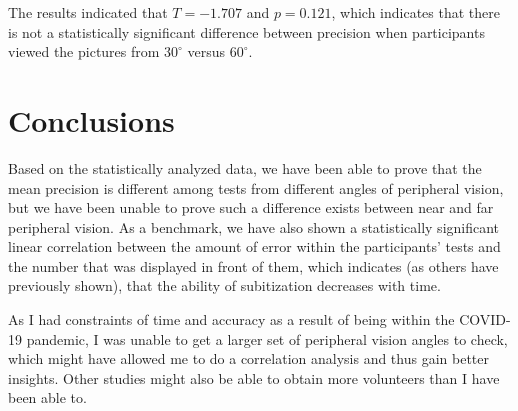 \documentclass[12pt]{article}
\begin{document}
The results indicated that $T = -1.707$ and $p = 0.121$, which indicates that
there is not a statistically significant difference between precision when
participants viewed the pictures from $30^{\circ}$ versus $60^{\circ}$.

\section{Conclusions}
Based on the statistically analyzed data, we have been able to prove that the
mean precision is different among tests from different angles of peripheral
vision, but we have been unable to prove such a difference exists between near
and far peripheral vision. As a benchmark, we have also shown a statistically
significant linear correlation between the amount of error within the
participants' tests and the number that was displayed in front of them, which
indicates (as others have previously shown), that the ability of subitization
decreases with time.

As I had constraints of time and accuracy as a result of being within the
COVID-19 pandemic, I was unable to get a larger set of peripheral vision angles
to check, which might have allowed me to do a correlation analysis and thus
gain better insights. Other studies might also be able to obtain more
volunteers than I have been able to.
\end{document}
